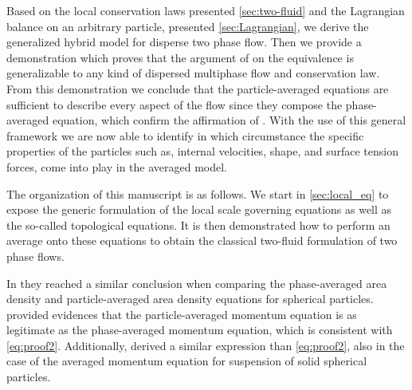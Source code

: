 Based on the local conservation laws presented \ref{sec:two-fluid} and the Lagrangian balance on an arbitrary particle, presented \ref{sec:Lagrangian}, we derive the generalized hybrid model for disperse two phase flow. 
Then we provide a demonstration which proves that the argument of \citet{lhuillier2000bilan} on the equivalence is generalizable to any kind of dispersed multiphase flow and conservation law. 
From this demonstration we conclude that the particle-averaged equations are sufficient to describe every aspect of the flow since they compose the phase-averaged equation, which confirm the affirmation of \citet[Appendix A]{zhang1997momentum}. 
With the use of this general framework we are now able to identify in which circumstance the specific properties of the particles such as, internal velocities, shape, and surface tension forces, come into play in the averaged model. 


The organization of this manuscript is as follows. 
We start in \ref{sec:local_eq} to expose the generic formulation of the local scale governing equations as well as the so-called topological equations. 
It is then demonstrated how to perform an average onto these equations to obtain the classical two-fluid formulation of two phase flows. 



In \cite{lhuillier2000bilan} they reached a similar conclusion when comparing the phase-averaged area density and particle-averaged area density equations for spherical particles. 
\citet[Appendix A]{zhang1997momentum} provided evidences that the particle-averaged momentum equation is as legitimate as the phase-averaged momentum equation, which is consistent with \ref{eq:proof2}. 
Additionally, \citet[Appendix A]{nott2011suspension} derived a similar expression than \ref{eq:proof2}, also in the case of the averaged momentum equation for suspension of solid spherical particles.